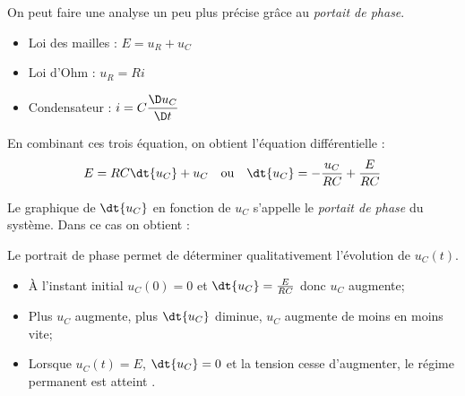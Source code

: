 \documentclass{cours}
\begin{document}
On peut faire une analyse un peu plus précise grâce au \emph{portait de phase}. 

\begin{minipage}{5cm}
\end{minipage}%
\begin{minipage}{\linewidth-5cm}
\begin{itemize}
\item Loi des mailles : $E=u_R+u_C$
\item Loi d'Ohm : $u_R=Ri$
\item Condensateur : $i=C \dfrac{\D u_C}{\D t}$
\end{itemize}
\end{minipage}
En combinant ces trois équation, on obtient l'équation différentielle : 
\begin{equation*}
E=RC \dt{u_C}+u_C \quad \text{ou} \quad \dt{u_C} = -\frac{u_C}{RC} + \frac{E}{RC}
\end{equation*}

Le graphique de $\dt{u_C}$ en fonction de $u_C$ s'appelle le \emph{portait de phase} du système. Dans ce cas on obtient :
\begin{center}
\end{center}

Le portrait de phase permet de déterminer qualitativement l'évolution de $u_C(t)$. 
\begin{itemize}
  \item À l'instant initial $u_C(0) = 0$ et $\dt{u_C}=\frac{E}{RC}$ donc $u_C$ augmente;
  \item Plus $u_C$ augmente, plus $\dt{u_C}$ diminue, $u_C$ augmente de moins en moins vite;
  \item Lorsque $u_C(t)=E$, $\dt{u_C}=0$ et la tension cesse d'augmenter, le régime permanent est atteint .
\end{itemize}
\end{document}
